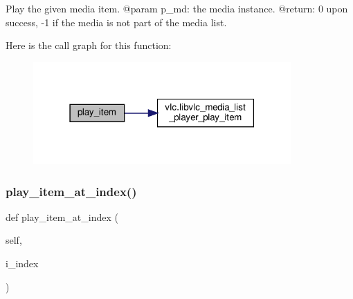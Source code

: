 \begin{DoxyVerb}Play the given media item.
@param p_md: the media instance.
@return: 0 upon success, -1 if the media is not part of the media list.
\end{DoxyVerb}
 Here is the call graph for this function\+:
\nopagebreak
\begin{figure}[H]
\begin{center}
\leavevmode
\includegraphics[width=279pt]{classvlc_1_1_media_list_player_a7b4dea65b1a9aebd68903e99c8f2a35b_cgraph}
\end{center}
\end{figure}
\mbox{\label{classvlc_1_1_media_list_player_a3417cb00988d93c1cfa0123e93059d19}} 
\subsubsection{\texorpdfstring{play\+\_\+item\+\_\+at\+\_\+index()}{play\_item\_at\_index()}}
{\footnotesize\ttfamily def play\+\_\+item\+\_\+at\+\_\+index (\begin{DoxyParamCaption}\item[{}]{self,  }\item[{}]{i\+\_\+index }\end{DoxyParamCaption})}

